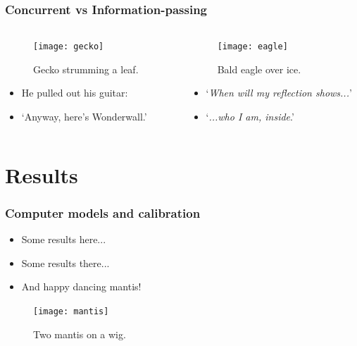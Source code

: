 \documentclass[10pt,xcolor=table]{beamer}
\begin{document}
\begin{frame}
  \frametitle{Concurrent vs Information-passing}
  \begin{columns}
    \begin{column}{0.5\textwidth}
      \begin{figure}
        \texttt{[image: gecko]}
        \caption{Gecko strumming a leaf\footnotemark[2].}
      \end{figure}
      \begin{itemize}
      \item He pulled out his guitar:
      \item `Anyway, here's Wonderwall.'
      \end{itemize}
    \end{column}
    \begin{column}{0.5\textwidth}
      \begin{figure}
        \texttt{[image: eagle]}
        \caption{Bald eagle over ice\footnotemark[3].}
      \end{figure}
      \begin{itemize}
      \item `\textit{When will my reflection shows...}'
      \item `\textit{...who I am, inside}.'
      \end{itemize}      
    \end{column}    
  \end{columns}
  \vspace{0.25cm}
\end{frame}


\section{Results}
\begin{frame}
  \frametitle{Computer models and calibration}
  \begin{itemize}
  \item Some results here...
  \item Some results there...
  \item And happy dancing mantis!
  \end{itemize}  
  \begin{figure}
    \texttt{[image: mantis]}
    \caption{Two mantis on a wig.}
  \end{figure}
\end{frame}
\end{document}
